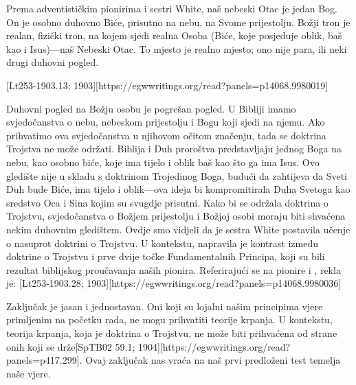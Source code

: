 Prema adventističkim pionirima i sestri White, naš nebeski Otac je jedan Bog. On je osobno duhovno Biće, prisutno na nebu, na Svome prijestolju. Božji tron je realan, fizički tron, na kojem sjedi realna Osoba (Biće, koje posjeduje oblik, baš kao i Isus)—naš Nebeski Otac. To mjesto je realno mjesto; ono nije para, ili neki drugi duhovni pogled.

[Lt253-1903.13; 1903][https://egwwritings.org/read?panels=p14068.9980019]

Duhovni pogled na Božju osobu je pogrešan pogled. U Bibliji imamo svjedočanstva o nebu, nebeskom prijestolju i Bogu koji sjedi na njemu. Ako prihvatimo ova svjedočanstva u njihovom očitom značenju, tada se doktrina Trojstva ne može održati. Biblija i Duh proroštva predstavljaju jednog Boga na nebu, kao osobno biće, koje ima tijelo i oblik baš kao što ga ima Isus. Ovo gledište nije u skladu s doktrinom Trojedinog Boga, budući da zahtijeva da Sveti Duh bude Biće, ima tijelo i oblik—ova ideja bi kompromitirala Duha Svetoga kao sredstvo Oca i Sina kojim su svugdje prisutni. Kako bi se održala doktrina o Trojstvu, svjedočanstva o Božjem prijestolju i Božjoj osobi moraju biti shvaćena nekim duhovnim gledištem. Ovdje smo vidjeli da je sestra White postavila učenje o  nasuprot doktrini o Trojstvu. U kontekstu, napravila je kontrast između doktrine o Trojstvu i prve dvije točke Fundamentalnih Principa, koji su bili rezultat biblijskog proučavanja naših pionira. Referirajući se na pionire i , rekla je: [Lt253-1903.28; 1903][https://egwwritings.org/read?panels=p14068.9980036]

Zaključak je jasan i jednostavan. Oni koji su lojalni našim principima vjere primljenim na početku rada, ne mogu prihvatiti teorije krpanja. U kontekstu, teorija krpanja, koja je doktrina o Trojstvu, ne može biti prihvaćena od strane onih koji se drže[SpTB02 59.1; 1904][https://egwwritings.org/read?panels=p417.299]. Ovaj zaključak nas vraća na naš prvi predloženi test temelja naše vjere.

